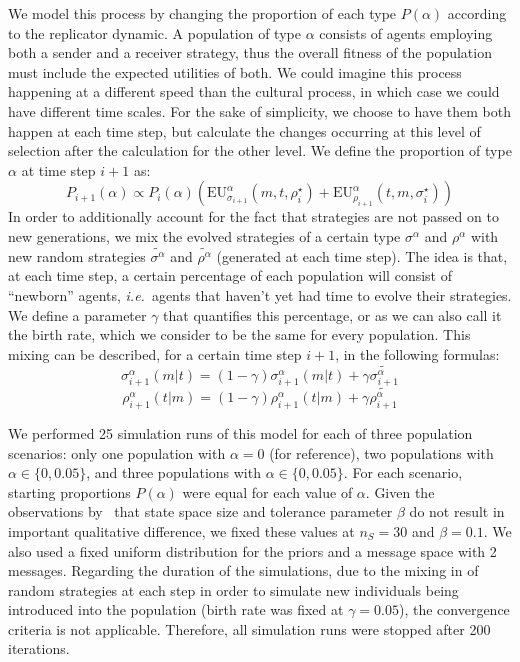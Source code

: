 \documentclass[a4paper]{article}
\begin{document}
We model this process by changing the proportion of each type $P(\alpha)$ according to the replicator dynamic.
A population of type $\alpha$ consists of agents employing both a sender and a receiver strategy, thus the overall fitness of the population must include the expected utilities of both.
We could imagine this process happening at a different speed than the cultural process, in which case we could have different time scales.
For the sake of simplicity, we choose to have them both happen at each time step, but calculate the changes occurring at this level of selection after the calculation for the other level.
We define the proportion of type $\alpha$ at time step $i+1$ as:
$$
P_{i+1}(\alpha) \propto P_i(\alpha)(\text{EU}_{\sigma_{i+1}}^{\alpha}(m,t,\rho_{i}^{\star}) + \text{EU}_{\rho_{i+1}}^{\alpha}(t,m,\sigma_{i}^{\star}))
$$
In order to additionally account for the fact that strategies are not passed on to new generations, we mix the evolved strategies of a certain type $\sigma^\alpha$ and $\rho^\alpha$ with new random strategies $\tilde{\sigma^\alpha}$ and $\tilde{\rho^\alpha}$ (generated at each time step).
The idea is that, at each time step, a certain percentage of each population will consist of ``newborn'' agents, \emph{i.e.}~agents that haven't yet had time to evolve their strategies.
We define a parameter $\gamma$ that quantifies this percentage, or as we can also call it the birth rate, which we consider to be the same for every population.
This mixing can be described, for a certain time step $i+1$, in the following formulas:
$$
\sigma_{i+1}^{\alpha}(m|t)=(1 - \gamma)\sigma_{i+1}^{\alpha}(m|t) + \gamma \tilde{\sigma_{i+1}^{\alpha}}
$$
$$
\rho_{i+1}^{\alpha}(t|m)=(1 - \gamma)\rho_{i+1}^{\alpha}(t|m) + \gamma \tilde{\rho_{i+1}^{\alpha}}
$$

We performed 25 simulation runs of this model for each of three population scenarios: only one population with $\alpha = 0$ (for reference), two populations with $\alpha \in \{0, 0.05\}$, and three populations with $\alpha \in \{0, 0.05\}$.
For each scenario, starting proportions $P(\alpha)$ were equal for each value of $\alpha$.
Given the observations by~\textcite{franke_vagueness_2017} that state space size and tolerance parameter $\beta$ do not result in important qualitative difference, we fixed these values at $n_S = 30$ and $\beta = 0.1$.
We also used a fixed uniform distribution for the priors and a message space with 2 messages.
Regarding the duration of the simulations, due to the mixing in of random strategies at each step in order to simulate new individuals being introduced into the population (birth rate was fixed at $\gamma = 0.05$), the convergence criteria is not applicable.
Therefore, all simulation runs were stopped after 200 iterations.
\end{document}
